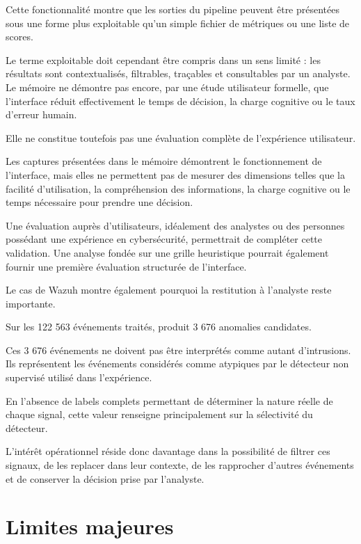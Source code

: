 Cette fonctionnalité montre que les sorties du pipeline peuvent être présentées sous une forme plus exploitable qu'un simple fichier de métriques ou une liste de scores.

Le terme \og exploitable \fg{} doit cependant être compris dans un sens limité : les résultats sont contextualisés, filtrables, traçables et consultables par un analyste. Le mémoire ne démontre pas encore, par une étude utilisateur formelle, que l'interface réduit effectivement le temps de décision, la charge cognitive ou le taux d'erreur humain.

Elle ne constitue toutefois pas une évaluation complète de l'expérience utilisateur.

Les captures présentées dans le mémoire démontrent le fonctionnement de l'interface, mais elles ne permettent pas de mesurer des dimensions telles que la facilité d'utilisation, la compréhension des informations, la charge cognitive ou le temps nécessaire pour prendre une décision.

Une évaluation auprès d'utilisateurs, idéalement des analystes ou des personnes possédant une expérience en cybersécurité, permettrait de compléter cette validation. Une analyse fondée sur une grille heuristique pourrait également fournir une première évaluation structurée de l'interface.

Le cas de Wazuh montre également pourquoi la restitution à l'analyste reste importante.

Sur les 122 563 événements traités, \logminer{} produit 3 676 anomalies candidates.

Ces 3 676 événements ne doivent pas être interprétés comme autant d'intrusions. Ils représentent les événements considérés comme atypiques par le détecteur non supervisé utilisé dans l'expérience.

En l'absence de labels complets permettant de déterminer la nature réelle de chaque signal, cette valeur renseigne principalement sur la sélectivité du détecteur.

L'intérêt opérationnel réside donc davantage dans la possibilité de filtrer ces signaux, de les replacer dans leur contexte, de les rapprocher d'autres événements et de conserver la décision prise par l'analyste.

\section{Limites majeures}

